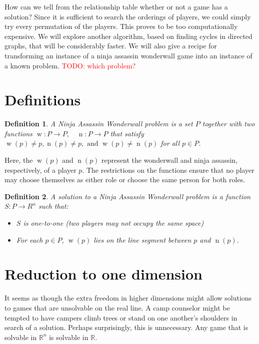 \documentclass[12pt]{article}
\newtheorem*{definition}{Definition}
\DeclareMathOperator{\w}{w}
\DeclareMathOperator{\n}{n}
\begin{document}
How can we tell from the relationship table whether or not a game has a solution? Since it is sufficient to search the orderings of players, we could simply try every permutation of the players. This proves to be too computationally expensive. We will explore another algorithm, based on finding cycles in directed graphs, that will be considerably faster. We will also give a recipe for transforming an instance of a ninja assassin wonderwall game into an instance of a known problem. \textcolor{red}{TODO: which problem?}


\section{Definitions}

\begin{definition}
A \emph{Ninja Assassin Wonderwall problem} is a set $P$ together with two functions $\w:P\to P, \quad \n: P\to P$ that satisfy $\w(p) \neq p, \n(p) \neq p, \text{ and } \w(p) \neq \n(p)$ for all $p \in P$.
\end{definition}

Here, the $\w(p)$ and $\n(p)$ represent the wonderwall and ninja assassin, respectively, of a player $p$. The restrictions on the functions ensure that no player may choose themselves as either role or choose the same person for both roles. 

\begin{definition}
A \emph{solution} to a Ninja Assassin Wonderwall problem is a function $S: P\to R^{n}$ such that:
    \begin{itemize}
    \item $S$ is one-to-one (two players may not occupy the same space)
    \item For each $p \in P$, $\w(p)$ lies on the line segment between $p$ and $\n(p)$.
    \end{itemize}
\end{definition}


\section{Reduction to one dimension}

It seems as though the extra freedom in higher dimensions might allow solutions to games that are unsolvable on the real line. A camp counselor might be tempted to have campers climb trees or stand on one another's shoulders in search of a solution. Perhaps surprisingly, this is unnecessary. Any game that is solvable in $\mathbb{R}^n$ is solvable in $\mathbb{R}$.
\end{document}
